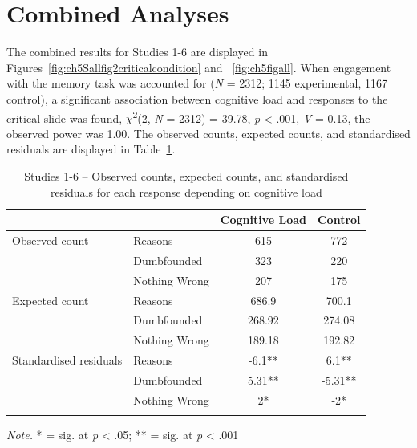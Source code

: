 \documentclass[
  american,
  man,floatsintext]{apa7}
\begin{document}
\hypertarget{combined-analyses}{%
\section{Combined Analyses}\label{combined-analyses}}

The combined results for Studies 1-6 are displayed in Figures~\ref{fig:ch5Sallfig2criticalcondition} and ~\ref{fig:ch5figall}. When engagement with the memory task was accounted for (\emph{N} = 2312; 1145 experimental, 1167 control), a significant association between cognitive load and responses to the critical slide was found, \(\chi\)\textsuperscript{2}(2, \emph{N} = 2312) = 39.78, \emph{p} \textless{} .001, \emph{V} = 0.13, the observed power was 1.00. The observed counts, expected counts, and standardised residuals are displayed in Table~\ref{tab:Salltab1dumb}.

\newpage

\begin{table}[tbp]

\begin{center}
\begin{threeparttable}

\caption{\label{tab:Salltab1dumb}Studies 1-6 – Observed counts, expected counts, and standardised residuals for each response depending on cognitive load}

\begin{tabular}{llcc}
\toprule
 & \multicolumn{1}{c}{} & \multicolumn{1}{c}{Cognitive Load} & \multicolumn{1}{c}{Control}\\
\midrule
Observed count & Reasons & 615 & 772\\
 & Dumbfounded & 323 & 220\\
 & Nothing Wrong & 207 & 175\\
Expected count & Reasons & 686.9 & 700.1\\
 & Dumbfounded & 268.92 & 274.08\\
 & Nothing Wrong & 189.18 & 192.82\\
Standardised residuals & Reasons & -6.1** & 6.1**\\
 & Dumbfounded & 5.31** & -5.31**\\
 & Nothing Wrong & 2* & -2*\\
\bottomrule
\addlinespace
\end{tabular}

\begin{tablenotes}[para]
\normalsize{\textit{Note.} * = sig. at \emph{p} < .05; ** = sig. at \emph{p} < .001}
\end{tablenotes}

\end{threeparttable}
\end{center}

\end{table}
\end{document}
